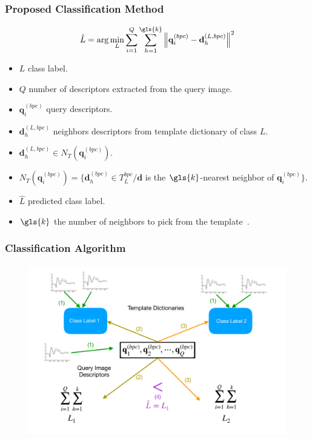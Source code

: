 \documentclass[aspectratio=169]{beamer}
\begin{document}
\begin{frame}
\frametitle{Proposed Classification Method}
\begin{center}
\begin{equation}
\hat{L} = \arg \min_{L} \sum_{i=1}^{Q} \sum_{h=1}^{\gls{k}} {\left\lVert \mathbf{q}_{i}^{(bpc)} -  \mathbf{d}_{h}^{(L,bpc)} \right\rVert}  ^{2} 
\label{eq:classification}
\end{equation}
\begin{itemize}
\item $L$ class label.
\item $Q$ number of descriptors extracted from the query image. 
\item $\mathbf{q}_{i}^{(bpc)} $ query descriptors.
\item $\mathbf{d}_{h}^{(L,bpc)} $ neighbors descriptors from template dictionary of class $L$.
\item $\mathbf{d}_{h}^{(L,bpc)} \in N_T(  \mathbf{q}_{i}^{(bpc)} )$.
\item $N_T(  \mathbf{q}_{i}^{(bpc)} ) = \{ \mathbf{d}_{h}^{(bpc)} \in T_{L}^{bpc} / \mathbf{d} $ is the $\gls{k}$-nearest neighbor of $  \mathbf{q}_{i}^{(bpc)} \}$.
\item $\hat{L}$ predicted class label.
\item $\gls{k}$ the number of neighbors to pick from the template~.
\end{itemize}
\end{center}
\end{frame}

\begin{frame}
\frametitle{Classification Algorithm}
\begin{center}
\begin{figure}[h!]
\centering
\includegraphics[height=7.5cm,width=13cm]{images/ClassificationFull.pdf}
\label{fig:nbnnclassification}
\end{figure}
\end{center}
\end{frame}   
\end{document}
